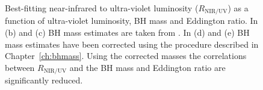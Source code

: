 \begin{figure}
\captionsetup[subfigure]{labelformat=empty}
  \centering
  \subfloat[\label{fig:correlations_contour_a}]{}
  \subfloat[\label{fig:correlations_contour_b}]{}
  \subfloat[\label{fig:correlations_contour_c}]{}
  \subfloat[\label{fig:correlations_contour_d}]{}
  \subfloat[\label{fig:correlations_contour_e}]{}
  \caption[{Best-fitting near-infrared to ultra-violet luminosity as a function of ultra-violet luminosity, BH mass and Eddington ratio.}]{Best-fitting near-infrared to ultra-violet luminosity ($R_{\text{NIR/UV}}$) as a function of ultra-violet luminosity, BH mass and Eddington ratio. In (b) and (c) BH mass estimates are taken from \citet{shen11}. In (d) and (e) BH mass estimates have been corrected using the procedure described in Chapter~\ref{ch:bhmass}. Using the corrected masses the correlations between $R_{\text{NIR/UV}}$ and the BH mass and Eddington ratio are significantly reduced.}
  \label{fig:correlations_contour}
\end{figure}

